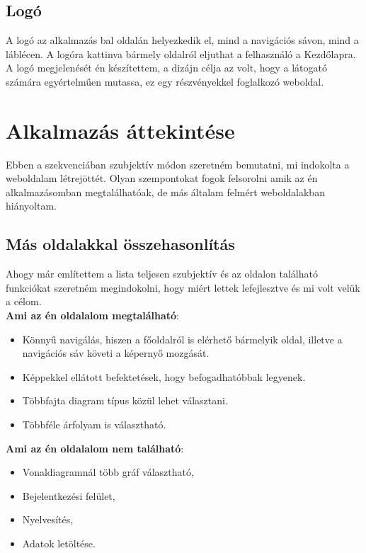 \subsection{Logó}

A logó az alkalmazás bal oldalán helyezkedik el, mind a navigációs sávon, mind a láblécen. A logóra kattinva bármely oldalról eljuthat a felhasználó a Kezdőlapra. A logó megjelenését én készítettem, a dizájn célja az volt, hogy a látogató számára egyértelműen mutassa, ez egy részvényekkel foglalkozó weboldal.

\section{Alkalmazás áttekintése}

Ebben a szekvenciában szubjektív módon szeretném bemutatni, mi indokolta a weboldalam létrejöttét. Olyan szempontokat fogok felsorolni amik az én alkalmazásomban megtalálhatóak, de más általam felmért weboldalakban hiányoltam.

\subsection{Más oldalakkal összehasonlítás}

Ahogy már említettem a lista teljesen szubjektív és az oldalon található funkciókat szeretném megindokolni, hogy miért lettek lefejlesztve és mi volt velük a célom. \\

\textbf{Ami az én oldalalom megtalálható}:

\begin{itemize}
\item Könnyű navigálás, hiszen a főoldalról is elérhető bármelyik oldal, illetve a navigációs sáv követi a képernyő mozgását. 
\item Képpekkel ellátott befektetések, hogy befogadhatóbbak legyenek.
\item Többfajta diagram típus közül lehet választani.
\item Többféle árfolyam is választható.
\end{itemize}

\textbf{Ami az én oldalalom nem található}:

\begin{itemize}
\item Vonaldiagramnál több gráf választható,
\item Bejelentkezési felület,
\item Nyelvesítés,
\item Adatok letöltése.
\end{itemize}

